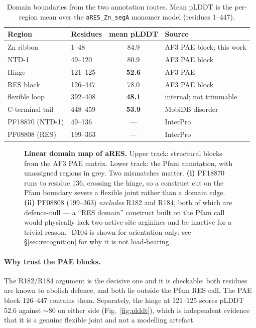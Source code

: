 \documentclass[11pt,a4paper]{article}
\begin{document}
\begin{table}[htbp]
\centering
\caption{Domain boundaries from the two annotation routes. Mean pLDDT is the
per-region mean over the \texttt{aRES\_Zn\_segA} monomer model
(residues 1--447).}
\label{tab:domains}
\small
\begin{tabular}{llcl}
\toprule
\textbf{Region} & \textbf{Residues} & \textbf{mean pLDDT} & \textbf{Source} \\
\midrule
Zn ribbon            & 1--48    & 84.9 & AF3 PAE block; this work \\
NTD-1                & 49--120  & 80.9 & AF3 PAE block \\
Hinge                & 121--125 & \textbf{52.6} & AF3 PAE \\
RES block            & 126--447 & 78.0 & AF3 PAE block \\
\quad flexible loop  & 392--408 & \textbf{48.1} & internal; not trimmable \\
C-terminal tail      & 448--459 & \textbf{53.9} & MobiDB disorder \\
\midrule
PF18870 (NTD-1)      & 49--136  & ---  & InterPro \\
PF08808 (RES)        & 199--363 & ---  & InterPro \\
\bottomrule
\end{tabular}
\end{table}

\begin{figure}[htbp]
\centering

\caption{\textbf{Linear domain map of aRES.} Upper track: structural blocks from
the AF3 PAE matrix. Lower track: the Pfam annotation, with unassigned regions in
grey. Two mismatches matter. \textbf{(i)} PF18870 runs to residue 136, crossing
the hinge, so a construct cut on the Pfam boundary severs a flexible joint rather
than a domain edge. \textbf{(ii)} PF08808 (199--363) \emph{excludes} R182 and
R184, both of which are defence-null --- a ``RES domain'' construct built on the
Pfam call would physically lack two active-site arginines and be inactive for a
trivial reason. $^{\dagger}$D104 is shown for orientation only; see
\S\ref{sec:recognition} for why it is not load-bearing.}
\label{fig:map}
\end{figure}

\paragraph{Why trust the PAE blocks.} The R182/R184 argument is the decisive one
and it is checkable: both residues are known to abolish defence, and both lie
outside the Pfam RES call. The PAE block 126--447 contains them. Separately, the
hinge at 121--125 scores pLDDT 52.6 against $\sim$80 on either side
(Fig.~\ref{fig:plddt}), which is independent evidence that it is a genuine
flexible joint and not a modelling artefact.
\end{document}
